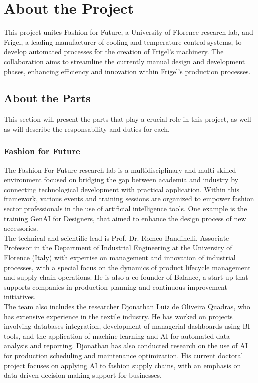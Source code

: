 \documentclass{article}%
\begin{document}
\section{About the Project}%
\label{sec:AbouttheProject}%
This project unites Fashion for Future, a University of Florence research lab, and Frigel, a leading manufacturer of cooling and temperature control systems, to develop automated processes for the creation of Frigel's machinery.  The collaboration aims to streamline the currently manual design and development phases, enhancing efficiency and innovation within Frigel's production processes.

%
\subsection{About the Parts}%
\label{subsec:AbouttheParts}%

        This section will present the parts that play a crucial role
        in this project, as well as will describe the responsability
        and duties for each.
\subsubsection{Fashion for Future}%
\label{ssubsec:FashionforFuture}%
The Fashion For Future research lab is a multidisciplinary and multi-skilled environment focused on bridging the gap between academia and industry by connecting technological development with practical application. Within this framework, various events and training sessions are organized to empower fashion sector professionals in the use of artificial intelligence tools. One example is the training GenAI for Designers, that aimed to enhance the design process of new accessories. \\ 
The technical and scientific lead is Prof. Dr. Romeo Bandinelli, Associate Professor in the Department of Industrial Engineering at the University of Florence (Italy) with expertise on management and innovation of industrial processes, with a special focus on the dynamics of product lifecycle management and supply chain operations. He is also a co-founder of Balance, a start-up that supports companies in production planning and continuous improvement initiatives. \\ 
The team also includes the researcher Djonathan Luiz de Oliveira Quadras, who has extensive experience in the textile industry. He has worked on projects involving databases integration, development of managerial dashboards using BI tools, and the application of machine learning and AI for automated data analysis and reporting. Djonathan has also conducted research on the use of AI for production scheduling and maintenance optimization. His current doctoral project focuses on applying AI to fashion supply chains, with an emphasis on data-driven decision-making support for businesses. \\ 
\end{document}
